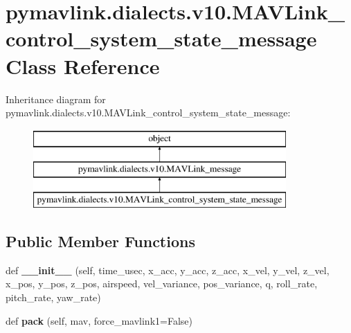 \hypertarget{classpymavlink_1_1dialects_1_1v10_1_1MAVLink__control__system__state__message}{}\section{pymavlink.\+dialects.\+v10.\+M\+A\+V\+Link\+\_\+control\+\_\+system\+\_\+state\+\_\+message Class Reference}
\label{classpymavlink_1_1dialects_1_1v10_1_1MAVLink__control__system__state__message}
Inheritance diagram for pymavlink.\+dialects.\+v10.\+M\+A\+V\+Link\+\_\+control\+\_\+system\+\_\+state\+\_\+message\+:\begin{figure}[H]
\begin{center}
\leavevmode
\includegraphics[height=3.000000cm]{classpymavlink_1_1dialects_1_1v10_1_1MAVLink__control__system__state__message}
\end{center}
\end{figure}
\subsection*{Public Member Functions}
\begin{DoxyCompactItemize}
\item 
\mbox{\label{classpymavlink_1_1dialects_1_1v10_1_1MAVLink__control__system__state__message_afd0d6f0a9be62f6cc9c091da4aba7b63}} 
def {\bfseries \+\_\+\+\_\+init\+\_\+\+\_\+} (self, time\+\_\+usec, x\+\_\+acc, y\+\_\+acc, z\+\_\+acc, x\+\_\+vel, y\+\_\+vel, z\+\_\+vel, x\+\_\+pos, y\+\_\+pos, z\+\_\+pos, airspeed, vel\+\_\+variance, pos\+\_\+variance, q, roll\+\_\+rate, pitch\+\_\+rate, yaw\+\_\+rate)
\item 
\mbox{\label{classpymavlink_1_1dialects_1_1v10_1_1MAVLink__control__system__state__message_a00d63509b2f35933f0583e0b289c2cc4}} 
def {\bfseries pack} (self, mav, force\+\_\+mavlink1=False)
\end{DoxyCompactItemize}
